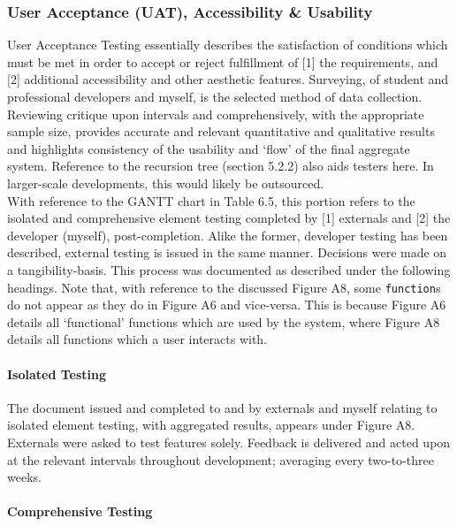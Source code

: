 \documentclass[11pt, english]{article}
\begin{document}
		\subsubsection{User Acceptance (UAT), Accessibility \& Usability}

	User Acceptance Testing essentially describes the satisfaction of conditions which must be met in order to accept or reject fulfillment of [1] the requirements, and [2] additional accessibility and other aesthetic features. Surveying, of student and professional developers and myself, is the selected method of data collection. Reviewing critique upon intervals and comprehensively, with the appropriate sample size, provides accurate and relevant quantitative and qualitative results and highlights consistency of the usability and `flow' of the final aggregate system. Reference to the recursion tree (section 5.2.2) also aids testers here. In larger-scale developments, this would likely be outsourced.\\

	With reference to the GANTT chart in Table 6.5, this portion refers to the isolated and comprehensive element testing completed by [1] externals and [2] the developer (myself), post-completion. Alike the former, developer testing has been described, external testing is issued in the same manner. Decisions were made on a tangibility-basis. This process was documented as described under the following headings. Note that, with reference to the discussed Figure A8, some \texttt{function}s do not appear as they do in Figure A6 and vice-versa. This is because Figure A6 details all `functional' functions which are used by the system, where Figure A8 details all functions which a user interacts with.

			\paragraph{Isolated Testing}

	The document issued and completed to and by externals and myself relating to isolated element testing, with aggregated results, appears under Figure A8. Externals were asked to test features solely. Feedback is delivered and acted upon at the relevant intervals throughout development; averaging every two-to-three weeks.

			\paragraph{Comprehensive Testing}
\end{document}
